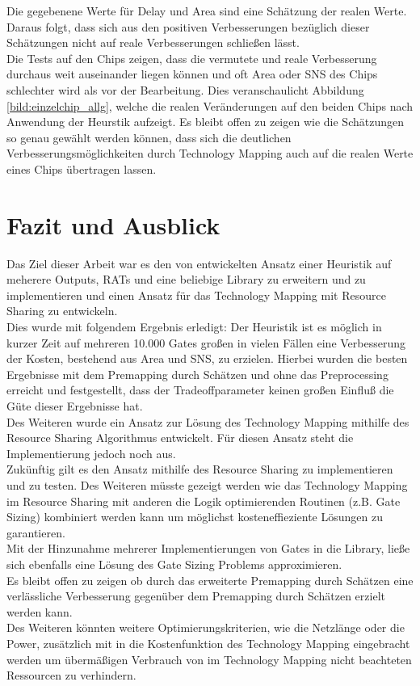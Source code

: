 \documentclass[11pt, a4paper, german]{article}
\newcommand{\TM}{Technology  Mapping }
\begin{document}
Die gegebenene Werte f\"ur Delay und Area sind eine Sch\"atzung der realen Werte. Daraus folgt, dass sich aus den positiven Verbesserungen bez\"uglich dieser Sch\"atzungen nicht auf reale Verbesserungen schließen l\"asst.\\
Die Tests auf den Chips zeigen, dass die vermutete und reale Verbesserung durchaus weit auseinander liegen k\"onnen und oft Area oder SNS des Chips schlechter wird als vor der Bearbeitung. Dies veranschaulicht Abbildung \ref{bild:einzelchip_allg}, welche die realen Ver\"anderungen auf den beiden Chips nach Anwendung der Heurstik aufzeigt. Es bleibt offen zu zeigen wie die Sch\"atzungen so genau gew\"ahlt werden k\"onnen, dass sich die deutlichen Verbesserungsm\"oglichkeiten durch \TM auch auf die realen Werte eines Chips \"ubertragen lassen.\\
\section{Fazit und Ausblick}
\label{sec:fazit_und_ausblick}
Das Ziel dieser Arbeit war es den von \cite{Elbert} entwickelten Ansatz einer Heuristik auf meherere Outputs, RATs und eine beliebige Library zu erweitern und zu implementieren und einen Ansatz für das \TM mit Resource Sharing zu entwickeln. \\
Dies wurde mit folgendem Ergebnis erledigt: Der Heuristik ist es m\"oglich in kurzer Zeit auf mehreren 10.000 Gates gro{\ss}en in vielen F\"allen eine Verbesserung der Kosten, bestehend aus Area und SNS, zu erzielen. Hierbei wurden die besten Ergebnisse mit dem Premapping durch Sch\"atzen und ohne das Preprocessing erreicht und festgestellt, dass der Tradeoffparameter keinen gro{\ss}en Einflu{\ss} die G\"ute dieser Ergebnisse hat. \\
Des Weiteren wurde ein Ansatz zur L\"osung des \TM mithilfe des Resource Sharing Algorithmus entwickelt. F\"ur diesen Ansatz steht die Implementierung jedoch noch aus. \\

Zuk\"unftig gilt es den Ansatz mithilfe des Resource Sharing zu implementieren und zu testen. Des Weiteren m\"usste gezeigt werden wie das \TM im Resource Sharing mit anderen die Logik optimierenden Routinen (z.B. Gate Sizing) kombiniert werden kann um m\"oglichst kosteneffieziente L\"osungen zu garantieren.\\
Mit der Hinzunahme mehrerer Implementierungen von Gates in die Library, ließe sich ebenfalls eine Lösung des Gate Sizing Problems approximieren.\\
Es bleibt offen zu zeigen ob durch das erweiterte Premapping durch Sch\"atzen eine verl\"assliche Verbesserung gegen\"uber dem Premapping durch Sch\"atzen erzielt werden kann.\\
Des Weiteren k\"onnten weitere Optimierungskriterien, wie die Netzl\"ange oder die Power, zus\"atzlich mit in die Kostenfunktion des \TM eingebracht werden um \"uberm\"a{\ss}igen Verbrauch von im \TM nicht beachteten Ressourcen zu verhindern.\\

\newpage
{}
\nocite{*}
\renewcommand{\refname}{9 \,\, Literaturverzeichnis}
{ \footnotesize


}
\end{document}

